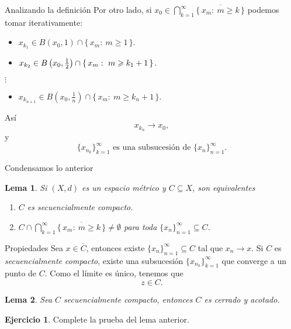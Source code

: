 \documentclass[utf8]{beamer}
\theoremstyle{plain}
\newtheorem{Lem}{Lema}                 %
\theoremstyle{definition}
\newtheorem{Ej}{Ejercicio}             %
\theoremstyle{remark}
\numberwithin{equation}{section}
\newcommand{\set}[1]{\{\,#1\,\}}    %
\renewcommand{\geq}{\geqslant}          %
\newcommand{\ov}{\overline}
\newcommand{\half}{{\mathchoice{\nhalf}{\thalf}{\shalf}{\shalf}}} %
\newcommand{\nhalf}{\frac{1}{2}}
\newcommand{\shalf}{{\scriptstyle\frac{1}{2}}} %
\newcommand{\thalf}{{\tfrac{1}{2}}} %
\begin{document}
\begin{frame}{Analizando la definici\'on}
  Por otro lado, si  $x_0 \in \bigcap_{k=1}^\infty\ov{\set{x_m:\ m\geq k}}$ podemos tomar iterativamente:
  
  \begin{itemize}
    \item $x_{k_1}\in B(x_0,1)\cap\set{x_m:\ m\geq 1}$.
    \item $x_{k_2}\in B\left(x_0,\half\right)\cap\set{x_m:\ m\geq k_1+1}$.
  \end{itemize}
  \hspace{1cm}$\vdots$
  \begin{itemize}
    \item $x_{k_{n+1}}\in B\left(x_0,\frac1n\right)\cap\set{x_m:\ m\geq k_{n}+1}$.
  \end{itemize}
  As\'i $$x_{k_n}\to x_0,$$ 
  y 
  \[\{x_{n_k}\}_{k=1}^{\infty} \text{ es una subsucesi\'on de } \{x_n\}_{n=1}^\infty.\]
\end{frame}

\begin{frame}{Condensamos lo anterior}
  \begin{Lem}\label{lem:equivSecCompYEncajados}
    Si $(X,d)$ es un espacio m\'etrico y $C\subseteq X$, son equivalentes
    \begin{enumerate}
      \item $C$ es secuencialmente compacto.
      \item $C\cap \bigcap_{k=1}^\infty\ov{\set{x_m:\ m\geq k}}\neq \emptyset$ para toda $\{x_n\}_{n=1}^\infty\subseteq C$.
    \end{enumerate}
  \end{Lem}
\end{frame}

\begin{frame}{Propiedades}
  Sea $x\in\ov C$, entonces existe $\{x_n\}_{n=1}^{\infty}\subseteq C$ tal que $x_n\to x$. Si $C$ es \emph{secuencialmente 
  compacto}, existe una subsucesi\'on $\{x_{n_k}\}_{k=1}^\infty$ que converge a un punto de $C$. 
  Como el l\'{i}mite es \'{u}nico, tenemos que 
  $$z\in C.$$
   
  \begin{Lem}\label{lem:equiv1Compacidad}
Sea $C$ secuencialmente compacto, entonces $C$ es cerrado y acotado.
  \end{Lem}

  \begin{Ej}
    Complete la prueba del lema anterior.
  \end{Ej}
\end{frame}
\end{document}
